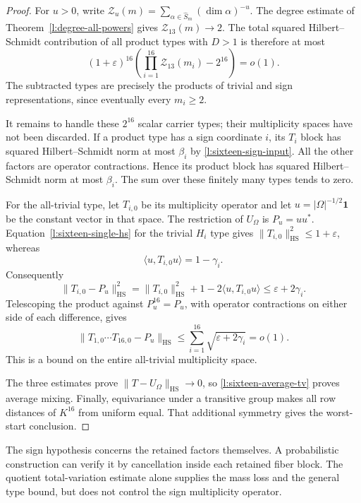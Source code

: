 \begin{proof}
For $u>0$, write
$\mathcal Z_u(m)=\sum_{\alpha\in\widehat S_m}(\dim\alpha)^{-u}$.
The degree estimate of Theorem~\ref{l:degree-all-powers} gives
$\mathcal Z_{13}(m)\to2$.  The total squared Hilbert--Schmidt contribution
of all product types with $D>1$ is therefore at most
\begin{equation}
 (1+\varepsilon)^{16}
       \left(\prod_{i=1}^{16}\mathcal Z_{13}(m_i)-2^{16}\right)=o(1).
 \label{l:sixteen-nonscalar-sum}
\end{equation}
The subtracted types are precisely the products of trivial and sign
representations, since eventually every $m_i\ge2$.

It remains to handle these $2^{16}$ scalar carrier types; their
multiplicity spaces have not been discarded.  If a product type has
a sign coordinate $i$, its $T_i$ block has squared Hilbert--Schmidt
norm at most $\beta_i$ by \eqref{l:sixteen-sign-input}.  All the
other factors are operator contractions.  Hence its product block
has squared Hilbert--Schmidt norm at most $\beta_i$.  The sum over
these finitely many types tends to zero.

For the all-trivial type, let $T_{i,0}$ be its multiplicity operator
and let $u=|\Omega|^{-1/2}\mathbf1$ be the constant vector in that
space.  The restriction of $U_\Omega$ is $P_u=uu^*$.
Equation~\eqref{l:sixteen-single-hs} for the trivial $H_i$ type gives
$\|T_{i,0}\|_{\mathrm{HS}}^2\le1+\varepsilon$, whereas
\[
 \langle u,T_{i,0}u\rangle=1-\gamma_i.
\]
Consequently
\begin{equation}
 \|T_{i,0}-P_u\|_{\mathrm{HS}}^2
 =\|T_{i,0}\|_{\mathrm{HS}}^2+1
       -2\langle u,T_{i,0}u\rangle
 \le\varepsilon+2\gamma_i.
 \label{l:sixteen-trivial-rank-one}
\end{equation}
Telescoping the product against $P_u^{16}=P_u$, with operator
contractions on either side of each difference, gives
\[
 \|T_{1,0}\cdots T_{16,0}-P_u\|_{\mathrm{HS}}
 \le\sum_{i=1}^{16}\sqrt{\varepsilon+2\gamma_i}=o(1).
\]
This is a bound on the entire all-trivial multiplicity space.

The three estimates prove $\|T-U_\Omega\|_{\mathrm{HS}}\to0$,
so \eqref{l:sixteen-average-tv} proves average mixing.  Finally,
equivariance under a transitive group makes all row distances of
$K^{16}$ from uniform equal.  That additional symmetry gives the
worst-start conclusion.
\end{proof}

The sign hypothesis concerns the retained factors themselves.  A
probabilistic construction can verify it by cancellation inside each
retained fiber block.  The quotient total-variation estimate alone
supplies the mass loss and the general type bound, but does not
control the sign multiplicity operator.

